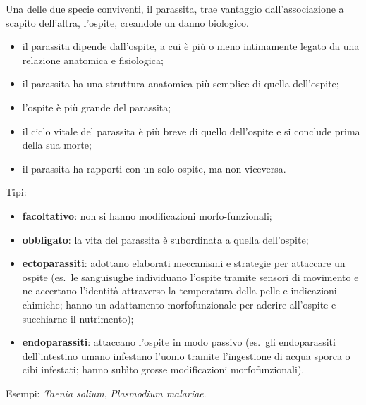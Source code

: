 Una delle due specie conviventi, il parassita, trae vantaggio dall'associazione a scapito dell'altra, l'ospite, creandole un danno biologico.
\begin{itemize}
  \item il parassita dipende dall'ospite, a cui è più o meno intimamente legato da una relazione anatomica e fisiologica;
  \item il parassita ha una struttura anatomica più semplice di quella dell'ospite;
  \item l'ospite è più grande del parassita;
  \item il ciclo vitale del parassita è più breve di quello dell'ospite e si conclude prima della sua morte;
  \item il parassita ha rapporti con un solo ospite, ma non viceversa.
\end{itemize}
Tipi:
\begin{itemize}
  \item \textbf{facoltativo}: non si hanno modificazioni morfo-funzionali;
  \item \textbf{obbligato}: la vita del parassita è subordinata a quella dell'ospite;
  \item \textbf{ectoparassiti}: adottano elaborati meccanismi e strategie per attaccare un ospite (es.\ le sanguisughe individuano l'ospite tramite sensori di movimento e ne accertano l'identità attraverso la temperatura della pelle e indicazioni chimiche; hanno un adattamento morfofunzionale per aderire all'ospite e succhiarne il nutrimento);
  \item \textbf{endoparassiti}: attaccano l'ospite in modo passivo (es.\ gli endoparassiti dell'intestino umano infestano l'uomo tramite l'ingestione di acqua sporca o cibi infestati; hanno subìto grosse modificazioni morfofunzionali).
\end{itemize}
Esempi: \textit{Taenia solium}, \textit{Plasmodium malariae}.
